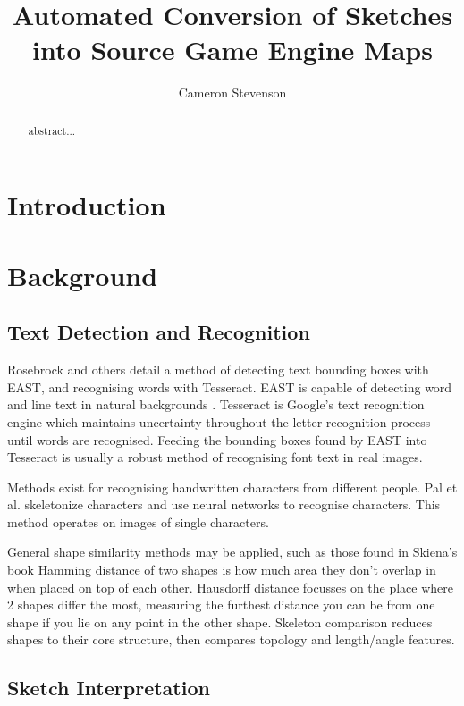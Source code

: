 \documentclass{IEEEtran}
\begin{document}
\title{Automated Conversion of Sketches into Source Game Engine Maps}
\author{Cameron Stevenson}
 
\begin{abstract}
abstract...
\end{abstract}

\maketitle

\section{Introduction}

\section{Background}
\subsection{Text Detection and Recognition}
Rosebrock \cite{rosebrock2018opencv} and others detail a method of detecting text bounding boxes with EAST, and recognising words with Tesseract. EAST is capable of detecting word and line text in natural backgrounds \cite{zhou2017east}. Tesseract \cite{smith2007overview} is Google's text recognition engine which maintains uncertainty throughout the letter recognition process until words are recognised. Feeding the bounding boxes found by EAST into Tesseract is usually a robust method of recognising font text in real images.

Methods exist for recognising handwritten characters from different people. Pal et al. \cite{pal2010handwritten} skeletonize characters and use neural networks to recognise characters. This method operates on images of single characters.

General shape similarity methods may be applied, such as those found in Skiena's book \cite{skiena2020algorithm} Hamming distance of two shapes is how much area they don't overlap in when placed on top of each other. Hausdorff distance focusses on the place where 2 shapes differ the most, measuring the furthest distance you can be from one shape if you lie on any point in the other shape. Skeleton comparison reduces shapes to their core structure, then compares topology and length/angle features.

\subsection{Sketch Interpretation}
\end{document}
